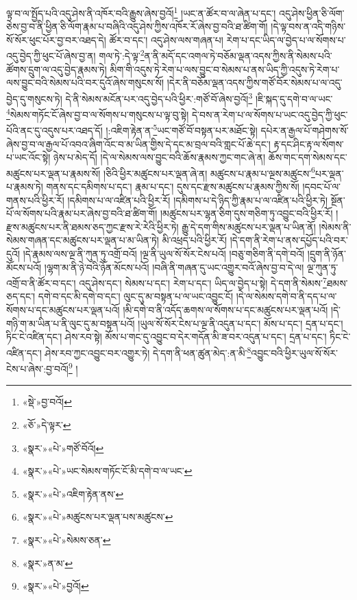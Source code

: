 ལྟ་བ་ལ་སྤྱོད་པའི་འདུ་ཤེས་ནི་འཁོར་བའི་རྒྱུས་ཞེས་བྱའོ།\footnote{«སྡེ་»བྱ་བའོ།} །ཡང་ན་ཚོར་བ་ལ་ཞེན་པ་དང་། འདུ་ཤེས་ཕྱིན་ཅི་ལོག་ཅེས་བྱ་བ་ནི་ཕྱིན་ཅི་ལོག་རྣམ་པ་བཞིའི་འདུ་ཤེས་ཀྱིས་འཁོར་རོ་ཞེས་བྱ་བའི་ཐ་ཚིག་གོ། །དེ་ལྟ་བས་ན་འདི་གཉིས་སོ་སོར་ཕུང་པོར་བྱ་བར་འཐད་དེ། ཚོར་བ་དང་། འདུ་ཤེས་ལས་གཞན་པ། རེག་པ་དང་ཡིད་ལ་བྱེད་པ་ལ་སོགས་པ་འདུ་བྱེད་ཀྱི་ཕུང་པོ་ཞེས་བྱ་ན། གལ་ཏེ་:དེ་ལྟ་\footnote{«ཅོ་»དེ་ལྟར་}ན་ནི་མདོ་དང་འགལ་ཏེ་བཅོམ་ལྡན་འདས་ཀྱིས་ནི་སེམས་པའི་ཚོགས་དྲུག་ལ་འདུ་བྱེད་རྣམས་ཏེ། མིག་གི་འདུས་ཏེ་རེག་པ་ལས་བྱུང་བ་སེམས་པ་ནས་ཡིད་ཀྱི་འདུས་ཏེ་རེག་པ་ལས་བྱུང་བའི་སེམས་པའི་བར་དུའོ་ཞེས་གསུངས་སོ། །དེར་ནི་བཅོམ་ལྡན་འདས་ཀྱིས་གཙོ་བོར་སེམས་པ་ལ་འདུ་བྱེད་དུ་གསུངས་ཏེ། དེ་ནི་སེམས་མངོན་པར་འདུ་བྱེད་པའི་ཕྱིར་:གཙོ་བོ་ཞེས་བྱའོ།\footnote{«སྣར་»«པེ་»གཙོ་བོའོ།} །ཇི་སྐད་དུ་དགེ་བ་ལ་ཡང་\footnote{«སྣར་»«པེ་»ཡང་སེམས་གཏོང་ངོ་མི་དགེ་བ་ལ་ཡང་}སེམས་གཏོང་ངོ་ཞེས་བྱ་བ་ལ་སོགས་པ་གསུངས་པ་ལྟ་བུ་སྟེ། དེ་བས་ན་རེག་པ་ལ་སོགས་པ་ཡང་འདུ་བྱེད་ཀྱི་ཕུང་པོའི་ནང་དུ་འདུས་པར་འཐད་དོ། །:འཇིག་རྟེན་ན་\footnote{«སྣར་»«པེ་»འཇིག་རྟེན་ནས་}ཡང་གཙོ་བོ་བསྟན་པར་མཐོང་སྟེ། དཔེར་ན་རྒྱལ་པོ་གཤེགས་སོ་ཞེས་བྱ་བ་ལ་རྒྱལ་པོ་འབའ་ཞིག་འོང་བ་མ་ཡིན་གྱིས་དེ་དང་མ་བྲལ་བའི་གླང་པོ་ཆེ་དང་། རྟ་དང་ཤིང་རྟ་ལ་སོགས་པ་ཡང་འོང་སྟེ། ཉེས་པ་མེད་དོ། །དེ་ལ་སེམས་ལས་བྱུང་བའི་ཆོས་རྣམས་ཀྱང་གང་ཞེ་ན། ཆོས་གང་དག་སེམས་དང་མཚུངས་པར་ལྡན་པ་རྣམས་སོ། །ཅིའི་ཕྱིར་མཚུངས་པར་ལྡན་ཞེ་ན། མཚུངས་པ་རྣམ་པ་ལྔས་མཚུངས་\footnote{«སྣར་»«པེ་»མཚུངས་པར་ལྡན་པས་མཚུངས་}པར་ལྡན་པ་རྣམས་ཏེ། གནས་དང་དམིགས་པ་དང་། རྣམ་པ་དང་། དུས་དང་རྫས་མཚུངས་པ་རྣམས་ཀྱིས་སོ། །དབང་པོ་ལ་གནས་པའི་ཕྱིར་རོ། །དམིགས་པ་ལ་འཛིན་པའི་ཕྱིར་རོ། །དམིགས་པ་དེ་ཉིད་ཀྱི་རྣམ་པ་ལ་འཛིན་པའི་ཕྱིར་ཏེ། སྔོན་པོ་ལ་སོགས་པའི་རྣམ་པར་ཞེས་བྱ་བའི་ཐ་ཚིག་གོ། །མཚུངས་པར་ལྷན་ཅིག་དུས་གཅིག་ཏུ་འབྱུང་བའི་ཕྱིར་རོ། །རྫས་མཚུངས་པར་ནི་ཐམས་ཅད་ཀྱང་རྫས་རེ་རེའི་ཕྱིར་ཏེ། རྒྱུ་དེ་དག་གིས་མཚུངས་པར་ལྡན་པ་ཡིན་ནོ། །སེམས་ནི་སེམས་གཞན་དང་མཚུངས་པར་ལྡན་པ་མ་ཡིན་ཏེ། མི་འཕྲད་པའི་ཕྱིར་རོ། །དེ་དག་ནི་རེག་པ་ནས་དཔྱོད་པའི་བར་དུའོ། །དེ་རྣམས་ལས་ལྔ་ནི་ཀུན་ཏུ་འགྲོ་བའོ། །ལྔ་ནི་ཡུལ་སོ་སོར་ངེས་པའོ། །བཅུ་གཅིག་ནི་དགེ་བའོ། །དྲུག་ནི་ཉོན་མོངས་པའོ། །ལྷག་མ་ནི་ཉེ་བའི་ཉོན་མོངས་པའོ། །བཞི་ནི་གཞན་དུ་ཡང་འགྱུར་བའོ་ཞེས་བྱ་བ་དེ་ལ། ལྔ་ཀུན་ཏུ་འགྲོ་བ་ནི་ཚོར་བ་དང་། འདུ་ཤེས་དང་། སེམས་པ་དང་། རེག་པ་དང་། ཡིད་ལ་བྱེད་པ་སྟེ། དེ་དག་ནི་སེམས་\footnote{«སྣར་»«པེ་»སེམས་ཅན་}ཐམས་ཅད་དང་། དགེ་བ་དང་མི་དགེ་བ་དང་། ལུང་དུ་མ་བསྟན་པ་ལ་ཡང་འབྱུང་ངོ། །དེ་ལ་སེམས་དགེ་བ་ནི་དད་པ་ལ་སོགས་པ་དང་མཚུངས་པར་ལྡན་པའོ། །མི་དགེ་བ་ནི་འདོད་ཆགས་ལ་སོགས་པ་དང་མཚུངས་པར་ལྡན་པའོ། །དེ་གཉི་ག་མ་ཡིན་པ་ནི་ལུང་དུ་མ་བསྟན་པའོ། །ཡུལ་སོ་སོར་ངེས་པ་ལྔ་ནི་འདུན་པ་དང་། མོས་པ་དང་། དྲན་པ་དང་། ཏིང་ངེ་འཛིན་དང་། ཤེས་རབ་སྟེ། མོས་པ་གང་དུ་འབྱུང་བ་དེར་གདོན་མི་ཟ་བར་འདུན་པ་དང་། དྲན་པ་དང་། ཏིང་ངེ་འཛིན་དང་། ཤེས་རབ་ཀྱང་འབྱུང་བར་འགྱུར་ཏེ། དེ་དག་ནི་ཕན་ཚུན་མེད་:ན་མི་\footnote{«སྣར་»ན་མ་}འབྱུང་བའི་ཕྱིར་ཡུལ་སོ་སོར་ངེས་པ་ཞེས་:བྱ་བའོ།\footnote{«སྣར་»«པེ་»བྱའོ།} །
